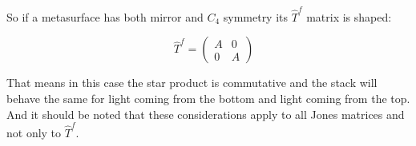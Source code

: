 So if a metasurface has both mirror and $C_4$ symmetry its $\hat T^f$ matrix is shaped:

\begin{equation}
    \quad
    \hat T^f =
    \begin{pmatrix}
        A & 0 \\
        0 & A
    \end{pmatrix}
\end{equation}

That means in this case the star product is commutative and the stack will behave the same for light coming from the bottom and light coming from the top.
And it should be noted that these considerations apply to all Jones matrices and not only to $\hat T^f$.

